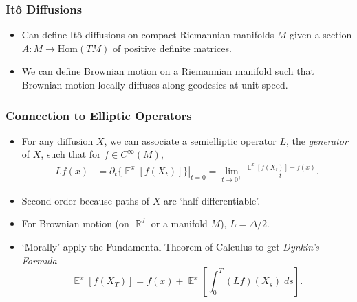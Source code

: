 \documentclass[usenames,dvipsnames,12pt]{beamer}
\DeclareMathOperator{\RR}{\mathbb{R}}
\DeclareMathOperator{\EE}{\mathbb{E}}
\begin{document}
\begin{frame}
    \frametitle{It\^{o} Diffusions}

    \begin{itemize}
        \item Can define It\^{o} diffusions on compact Riemannian manifolds $M$ given a section $A: M \to \text{Hom}(TM)$ of positive definite matrices.

        \item We can define Brownian motion on a Riemannian manifold such that Brownian motion locally diffuses along geodesics at unit speed.
    \end{itemize}

\end{frame}





\begin{frame}
    \frametitle{Connection to Elliptic Operators}

    \begin{itemize}
        \item For any diffusion $X$, we can associate a semielliptic operator $L$, the \emph{generator} of $X$, such that for $f \in C^\infty(M)$,
        \begin{align*}
            Lf(x) &= \left. \partial_t \{ \EE^x[f(X_t)] \} \right|_{t = 0} = \lim_{t \to 0^+} \frac{\EE^x[f(X_t)] - f(x)}{t}.
        \end{align*}

        \item Second order because paths of $X$ are `half differentiable'.

        \item For Brownian motion (on $\RR^d$ or a manifold $M$), $L = \Delta / 2$.

        \item `Morally' apply the Fundamental Theorem of Calculus to get \emph{Dynkin's Formula}
        \[ \EE^x[f(X_T)] = f(x) + \EE^x \left[ \int_0^T (Lf)(X_s)\; ds \right]. \]
    \end{itemize}
\end{frame}
\end{document}
